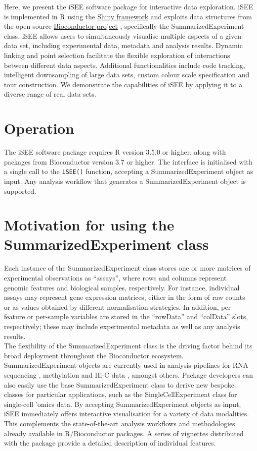 \documentclass[10pt,a4paper,twocolumn]{article}
\begin{document}
Here, we present the iSEE software package for interactive data exploration.
iSEE is implemented in R using the \href{https://shiny.rstudio.com/}{Shiny framework}  \citep{chang2017shiny} and exploits data structures from the open-source \href{https://www.bioconductor.org/}{Bioconductor project}  \citep{gentleman2004bioconductor}, specifically the SummarizedExperiment class.
iSEE allows users to simultaneously visualise multiple aspects of a given data set, including experimental data, metadata and analysis results.
Dynamic linking and point selection facilitate the flexible exploration of interactions between different data aspects.
Additional functionalities include code tracking, intelligent downsampling of large data sets, custom colour scale specification and tour construction.
We demonstrate the capabilities of iSEE by applying it to a diverse range of real data sets.

\section*{Operation}
The iSEE software package requires R version 3.5.0 or higher, along with packages from Bioconductor version 3.7 or higher.
The interface is initialised with a single call to the \texttt{iSEE()} function, accepting a SummarizedExperiment object \citep{huber2015orchestrating} as input.
Any analysis workflow that generates a SummarizedExperiment object is supported.

\section*{Motivation for using the SummarizedExperiment class}
Each instance of the SummarizedExperiment class stores one or more matrices of experimental observations as ``assays'', where rows and columns represent genomic features and biological samples, respectively.
For instance, individual assays may represent gene expression matrices, either in the form of raw counts or as values obtained by different normalisation strategies.
In addition, per-feature or per-sample variables are stored in the ``rowData'' and ``colData'' slots, respectively; these may include experimental metadata as well as any analysis results.\\

The flexibility of the SummarizedExperiment class is the driving factor behind its broad deployment throughout the Bioconductor ecosystem.
SummarizedExperiment objects are currently used in analysis pipelines for RNA sequencing \citep{love2014moderated}, methylation \citep{aryee2014minfi} and Hi-C data \citep{lun2016infrastructure}, amongst others.
Package developers can also easily use the base SummarizedExperiment class to derive new bespoke classes for particular applications, such as the SingleCellExperiment class for single-cell 'omics data.
By accepting SummarizedExperiment objects as input, iSEE immediately offers interactive visualisation for a variety of data modalities.
This complements the state-of-the-art analysis workflows and methodologies already available in R/Bioconductor packages.
A series of vignettes distributed with the package provide a detailed description of individual features. \\
\end{document}
